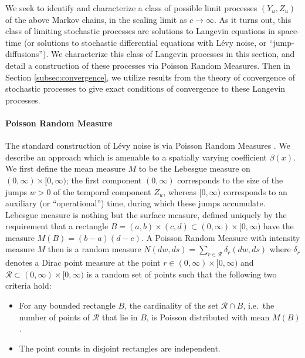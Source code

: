 \documentclass[a4paper,12pt]{elsarticle}
\numberwithin{equation}{section}
\theoremstyle{plain}
\theoremstyle{definition}
\theoremstyle{remark}
\numberwithin{equation}{section}
\newcommand{\1}{\mathbf 1}
\begin{document}
We seek to identify and characterize a class of possible limit processes
$(Y_u, Z_u)$ of the above Markov chains,
in the scaling limit as $c \to \infty$. As it turns out, this class of 
limiting stochastic processes are solutions to
Langevin equations in space-time (or solutions to stochastic differential
equations with L\'evy noise, or ``jump-diffusions'').
We characterize this class of Langevin processes in this section, and detail 
a construction of these processes via Poisson Random Measures.
Then in Section \ref{subsec:convergence}, we utilize results from the theory of
convergence of stochastic processes to give exact conditions of convergence
to these Langevin processes.

\paragraph{Poisson Random Measure}
The standard construction of L\'evy noise is via Poisson Random Measures
\cite{Applebaum}.  We describe an approach which is amenable to a 
spatially varying coefficient $\beta(x)$. 
We first define the mean measure $M$ to be the Lebesgue measure on 
$(0,\infty) \times [0,\infty)$; the first component $(0,\infty)$ corresponds 
to the size of the jumps $w > 0$ of the temporal component $Z_u$, whereas $[0,\infty)$
corresponds to an auxiliary (or ``operational'') time, during which these jumps accumulate. 
Lebesgue measure is nothing but the surface measure, defined uniquely by the requirement 
that a rectangle $B = (a,b) \times (c,d) \subset (0,\infty) \times [0,\infty)$
have the measure $M(B) = (b-a)(d-c)$.  
A Poisson Random Measure with intensity measure $M$ then is a random measure 
$N(dw, ds) = \sum_{r \in \mathcal R} \delta_{r}(dw, ds)$ where $\delta_r$ 
denotes a Dirac point measure at the point $r \in (0,\infty) \times [0,\infty)$
and $\mathcal R \subset (0,\infty) \times [0,\infty)$ is a random set of points 
such that the following two criteria hold: 
\begin{itemize}
  \item 
  For any bounded rectangle $B$, the cardinality of the set $\mathcal R \cap B$,
  i.e.\ the number of 
  points of $\mathcal R$ that lie in $B$, is Poisson distributed with mean 
  $M(B)$.
  \item
  The point counts in disjoint rectangles are independent. 
\end{itemize}
\end{document}

